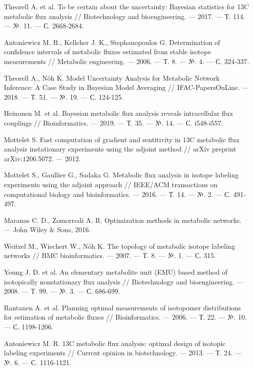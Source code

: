 \documentclass[14pt, a4paper]{extreport}
\begin{document}
\begin{thebibliography}{XXXX}
	Theorell A. et al. To be certain about the uncertainty: Bayesian statistics for 13C metabolic flux analysis // Biotechnology and bioengineering. --- 2017. --- Т. 114. --- №. 11. --- С. 2668-2684.
	
	Antoniewicz M. R., Kelleher J. K., Stephanopoulos G. Determination of confidence intervals of metabolic fluxes estimated from stable isotope measurements // Metabolic engineering. --- 2006. --- Т. 8. --- №. 4. --- С. 324-337.
	
	Theorell A., Nöh K. Model Uncertainty Analysis for Metabolic Network Inference: A Case Study in Bayesian Model Averaging // IFAC-PapersOnLine. --- 2018. --- Т. 51. --- №. 19. --- С. 124-125.
	
	Heinonen M. et al. Bayesian metabolic flux analysis reveals intracellular flux couplings // Bioinformatics. --- 2019. --- Т. 35. --- №. 14. --- С. i548-i557.
	
	Mottelet S. Fast computation of gradient and sentitivity in 13C metabolic flux analysis instationary experiments using the adjoint method // arXiv preprint arXiv:1206.5072. --- 2012.
	
	Mottelet S., Gaullier G., Sadaka G. Metabolic flux analysis in isotope labeling experiments using the adjoint approach // IEEE/ACM transactions on computational biology and bioinformatics. --- 2016. --- Т. 14. --- №. 2. --- С. 491-497.
	
	Maranas C. D., Zomorrodi A. R. Optimization methods in metabolic networks. --- John Wiley \& Sons, 2016.
	
	Weitzel M., Wiechert W., Nöh K. The topology of metabolic isotope labeling networks // BMC bioinformatics. --- 2007. --- Т. 8. --- №. 1. --- С. 315.
	
	Young J. D. et al. An elementary metabolite unit (EMU) based method of isotopically nonstationary flux analysis // Biotechnology and bioengineering. --- 2008. --- Т. 99. --- №. 3. --- С. 686-699.
	
	Rantanen A. et al. Planning optimal measurements of isotopomer distributions for estimation of metabolic fluxes // Bioinformatics. --- 2006. --- Т. 22. --- №. 10. --- С. 1198-1206.
	
	Antoniewicz M. R. 13C metabolic flux analysis: optimal design of isotopic labeling experiments // Current opinion in biotechnology. --- 2013. --- Т. 24. --- №. 6. --- С. 1116-1121.
	

\end{thebibliography}
\end{document}
